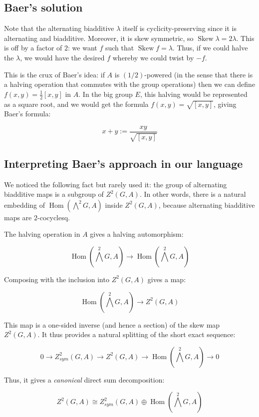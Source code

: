 \documentclass[10pt]{amsart}
\newcommand{\Skew}{\operatorname{Skew}}
\begin{document}
\subsection{Baer's solution}

Note that the alternating biadditive $\lambda$ itself is
cyclicity-preserving since it is alternating and biadditive. Moreover,
it is skew symmetric, so $\Skew \lambda = 2 \lambda$. This is off by a
factor of $2$: we want $f$ such that $\Skew f = \lambda$. Thus, if we
could halve the $\lambda$, we would have the desired $f$ whereby we
could twist by $-f$.

This is the crux of Baer's idea: if $A$ is $(1/2)$-powered (in the
sense that there is a halving operation that commutes with the group
operations) then we can define $f(x,y) = \frac{1}{2}[x,y]$ in $A$. In
the big group $E$, this halving would be represented as a square root,
and we would get the formula $f(x,y) = \sqrt{[x,y]}$, giving Baer's
formula:

$$x + y := \frac{xy}{\sqrt{[x,y]}}$$

\subsection{Interpreting Baer's approach in our language}

We noticed the following fact but rarely used it: the group of
alternating biadditive maps is a subgroup of $Z^2(G,A)$. In other
words, there is a natural embedding of
$\operatorname{Hom}(\bigwedge^2G,A)$ inside $Z^2(G,A)$, because
alternating biadditive maps are $2$-cocyclesq.

The halving operation in $A$ gives a halving automorphism:

$$\operatorname{Hom}(\bigwedge^2G,A) \to \operatorname{Hom}(\bigwedge^2G,A)$$

Composing with the inclusion into $Z^2(G,A)$ gives a map:

$$\operatorname{Hom}(\bigwedge^2G,A) \to Z^2(G,A)$$

This map is a one-sided inverse (and hence a section) of the skew map
$Z^2(G,A)$. It thus provides a natural splitting of the short exact sequence:

$$0 \to Z^2_{sym}(G,A) \to Z^2(G,A) \to \operatorname{Hom}(\bigwedge^2G,A) \to 0$$

Thus, it gives a {\em canonical} direct sum decomposition:

$$Z^2(G,A) \cong Z^2_{sym}(G,A) \oplus \operatorname{Hom}(\bigwedge^2G,A)$$
\end{document}
